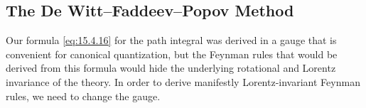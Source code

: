 
\subsection{The De Witt--Faddeev--Popov Method}

Our formula \eqref{eq:15.4.16} for the path integral was derived in a gauge
that is convenient for canonical quantization, but the Feynman rules that
would be derived from this formula would hide the underlying rotational and
Lorentz invariance of the theory. In order to derive manifestly
Lorentz-invariant Feynman rules, we need to change the gauge.

